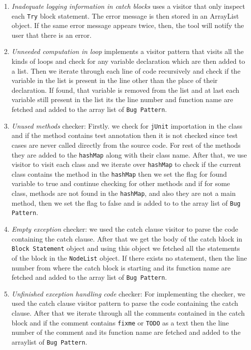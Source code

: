 \documentclass[sigconf]{acmart}
\begin{document}
\begin{enumerate}
    \item \textit{Inadequate logging information in catch blocks} uses a visitor that only inspect each \texttt{Try} block statement. The error message is then stored in an ArrayList object. If the same error message appears twice, then, the tool will notify the user that there is an error.
    \item \textit{Unneeded computation in loop} implements a visitor pattern that visits all the kinds of loops and check for any variable declaration which are then added to a list. Then we iterate through each line of code recursively and check if the variable in the list is present in the line other than the place of their declaration. If found, that variable is removed from the list and at last each variable still present in the list its the line number and function name are fetched and added to the array list of \texttt {Bug Pattern}.  
    \item \textit{Unused methods} checker: Firstly. we check for \texttt{jUnit} importation in the class and if the method contains test annotation then it is not checked since test cases are never called directly from the source code. For rest of the methods they are added to the \texttt{hashMap} along with their class name. After that, we use visitor to visit each class and we iterate over \texttt{hashMap} to check if the current class contains the method in the \texttt{hashMap} then we set the flag for found variable to true and continue checking for other methods and if for some class, methods are not found in the \texttt{hashMap}, and also they are not a main method, then we set the flag to false and is added to to the array list of \texttt {Bug Pattern}.
    \item \textit{Empty exception} checker: we used the catch clause visitor to parse the code containing the catch clause. After that we get the body of the catch block in \texttt {Block Statement} object and using this object we fetched all the statements of the block in the \texttt {NodeList} object. If there exists no statement, then the line number from where the catch block is starting and its function name are fetched and added to the array list of \texttt {Bug Pattern}. 
    \item \textit{Unfinished exception handling code} checker: For implementing the checker, we used the catch clause visitor pattern to parse the code containing the catch clause. After that we iterate through all the comments contained in the catch block and if the comment contains \texttt {fixme} or \texttt{TODO} as a text then the line number of the comment and its function name are fetched and added to the arraylist of \texttt{Bug Pattern}.

\end{enumerate}
\end{document}

